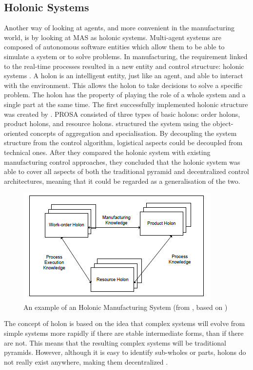 \subsection{Holonic Systems}
Another way of looking at agents, and more convenient in the manufacturing world, is by looking at MAS as holonic systems. Multi-agent systems are composed of autonomous software entities which allow them to be able to simulate a system or to solve problems. In manufacturing, the requirement linked to the real-time processes resulted in a new entity and control structure: holonic systems \citep{giret2005multi}. A holon is an intelligent entity, just like an agent, and able to interact with the environment. This allows the holon to take decisions to solve a specific problem. The holon has the property of playing the role of a whole system and a single part at the same time. The first successfully implemented holonic structure was created by \citet{van1998reference}. PROSA  consisted of three types of basic holons: order holons, product holons, and resource holons. \citet{van1998reference} structured the system using the object-oriented concepts of aggregation and specialisation. By decoupling the system structure from the control algorithm, logistical aspects could be decoupled from technical ones. After they compared the holonic system with existing manufacturing control approaches, they concluded that the holonic system was able to cover all aspects of both the traditional pyramid and decentralized control architectures, meaning that it could be regarded as a generalisation of the two. 
\begin{figure}[h]
\centering
\includegraphics[width=0.7\linewidth]{img/holonic_manufacturing}
\caption{An example of an Holonic Manufacturing System (from \citet{giret2005multi}, based on \citet{van1998reference})}
\label{fig:holonicmanufacturing}
\end{figure}

The concept of holon is based on the idea that complex systems will evolve from simple systems more rapidly if there are stable intermediate forms, than if there are not. This means that the resulting complex systems will be traditional pyramids. However, although it is easy to identify sub-wholes or parts, holons do not really exist anywhere, making them decentralized \citep{van1998reference}.

